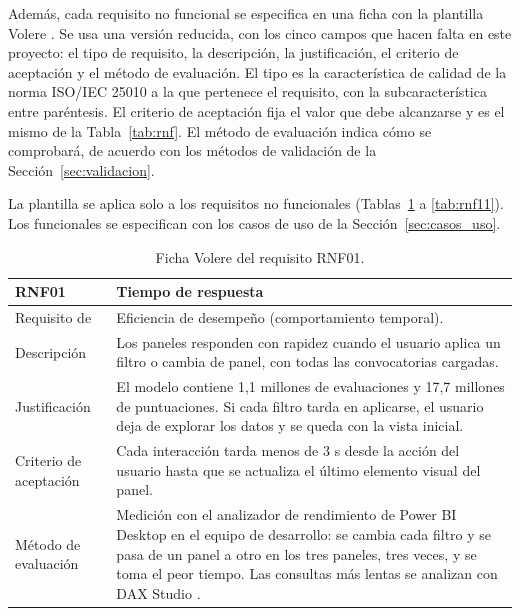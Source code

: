 \documentclass[12pt, a4paper, oneside]{report}
\begin{document}
Además, cada requisito no funcional se especifica en una ficha con la plantilla Volere \cite{robertson2012mastering}. Se usa una versión reducida, con los cinco campos que hacen falta en este proyecto: el tipo de requisito, la descripción, la justificación, el criterio de aceptación y el método de evaluación. El tipo es la característica de calidad de la norma ISO/IEC 25010 \cite{iso25010_2011} a la que pertenece el requisito, con la subcaracterística entre paréntesis. El criterio de aceptación fija el valor que debe alcanzarse y es el mismo de la Tabla~\ref{tab:rnf}. El método de evaluación indica cómo se comprobará, de acuerdo con los métodos de validación de la Sección~\ref{sec:validacion}.

La plantilla se aplica solo a los requisitos no funcionales (Tablas~\ref{tab:rnf01} a \ref{tab:rnf11}). Los funcionales se especifican con los casos de uso de la Sección~\ref{sec:casos_uso}.

\begin{table}[H]
\centering
\small
{}\renewcommand{\arraystretch}{1.0}\setlength{\defaultaddspace}{3pt}
\begin{tabularx}{\textwidth}{@{} >{\raggedright\arraybackslash}p{3.4cm} X @{}}
\toprule
\textbf{RNF01} & \textbf{Tiempo de respuesta} \\ \midrule
Requisito de & Eficiencia de desempeño (comportamiento temporal). \\ \addlinespace
Descripción & Los paneles responden con rapidez cuando el usuario aplica un filtro o cambia de panel, con todas las convocatorias cargadas. \\ \addlinespace
Justificación & El modelo contiene 1,1 millones de evaluaciones y 17,7 millones de puntuaciones. Si cada filtro tarda en aplicarse, el usuario deja de explorar los datos y se queda con la vista inicial. \\ \addlinespace
Criterio de aceptación & Cada interacción tarda menos de 3 s desde la acción del usuario hasta que se actualiza el último elemento visual del panel. \\ \addlinespace
Método de evaluación & Medición con el analizador de rendimiento de Power BI Desktop en el equipo de desarrollo: se cambia cada filtro y se pasa de un panel a otro en los tres paneles, tres veces, y se toma el peor tiempo. Las consultas más lentas se analizan con DAX Studio \cite{dax_studio}. \\ \bottomrule
\end{tabularx}
\caption{Ficha Volere del requisito RNF01.}
\label{tab:rnf01}
\end{table}
\end{document}

